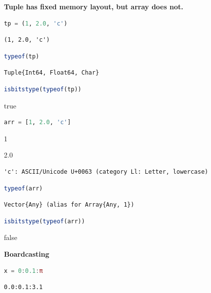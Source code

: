 \documentclass[
  notoc %
]{tufte-book}
\begin{document}
\textbf{Tuple has fixed memory layout, but array does not.}

\begin{lstlisting}[language=Julia]
tp = (1, 2.0, 'c')
\end{lstlisting}

\begin{lstlisting}[language=Output]
(1, 2.0, 'c')
\end{lstlisting}

\begin{lstlisting}[language=Julia]
typeof(tp)
\end{lstlisting}

\begin{lstlisting}[language=Output]
Tuple{Int64, Float64, Char}
\end{lstlisting}

\begin{lstlisting}[language=Julia]
isbitstype(typeof(tp))
\end{lstlisting}

true

\begin{lstlisting}[language=Julia]
arr = [1, 2.0, 'c']
\end{lstlisting}

1

2.0

\begin{lstlisting}[language=Output]
'c': ASCII/Unicode U+0063 (category Ll: Letter, lowercase)
\end{lstlisting}

\begin{lstlisting}[language=Julia]
typeof(arr)
\end{lstlisting}

\begin{lstlisting}[language=Output]
Vector{Any} (alias for Array{Any, 1})
\end{lstlisting}

\begin{lstlisting}[language=Julia]
isbitstype(typeof(arr))
\end{lstlisting}

false

\textbf{Boardcasting}

\begin{lstlisting}[language=Julia]
x = 0:0.1:π
\end{lstlisting}

\begin{lstlisting}[language=Output]
0.0:0.1:3.1
\end{lstlisting}
\end{document}
